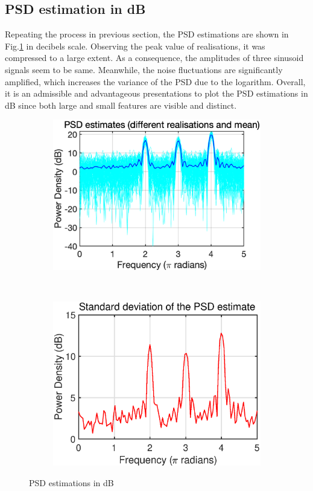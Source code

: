 \subsection{PSD estimation in dB}
Repeating the process in previous section, the PSD estimations are shown in Fig.\ref{fig:1_3_c} in decibels scale. Observing the peak value of realisations, it was compressed to a large extent.  As a consequence, the amplitudes of three sinusoid signals seem to be same. Meanwhile, the noise fluctuations are significantly amplified, which increases the variance of the PSD due to the logarithm. Overall, it is an admissible and advantageous presentations to plot the PSD estimations in dB since both large and small features are visible and distinct.
\begin{figure}[htbp]
     \centering
     \begin{subfigure}[b]{0.4\textwidth}
         \centering
         \includegraphics[width=\textwidth]{fig/13/13c1.eps}
     \end{subfigure}
     ~
     \begin{subfigure}[b]{0.4\textwidth}
         \centering
         \includegraphics[width=\textwidth]{fig/13/13c2.eps}
     \end{subfigure}
        \caption{PSD estimations in dB}
        \label{fig:1_3_c}
\end{figure}
